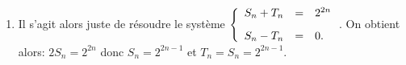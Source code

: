 \documentclass[a4paper, 11pt,reqno]{article}
\begin{document}
\begin{correction}
\begin{enumerate}

\item Il s'agit alors juste de r\'esoudre le syst\`{e}me $\left\lbrace \begin{array}{lll}  S_n+T_n&=&2^{2n}\vsec \\ S_n-T_n&=& 0. \end{array}\right.$. On obtient alors: $2S_n=2^{2n}$  donc $S_n= 2^{2n-1}$ et $T_n=S_n=2^{2n-1}$.
\end{enumerate}
\end{correction}





\vspace{0.2cm}
\end{document}
